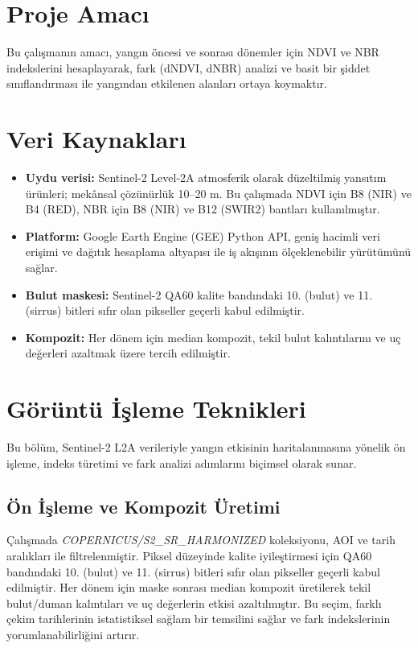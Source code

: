 \documentclass[11pt,a4paper]{article}
\begin{document}
\section{Proje Amacı}
Bu çalışmanın amacı, yangın öncesi ve sonrası dönemler için NDVI ve NBR indekslerini
hesaplayarak, fark (dNDVI, dNBR) analizi ve basit bir şiddet sınıflandırması ile
yangından etkilenen alanları ortaya koymaktır.

\section{Veri Kaynakları}

\begin{itemize}
  \item \textbf{Uydu verisi:} Sentinel-2 Level-2A atmosferik olarak düzeltilmiş yansıtım ürünleri; mekânsal çözünürlük 10--20 m. Bu çalışmada NDVI için B8 (NIR) ve B4 (RED), NBR için B8 (NIR) ve B12 (SWIR2) bantları kullanılmıştır.
  \item \textbf{Platform:} Google Earth Engine (GEE) Python API, geniş hacimli veri erişimi ve dağıtık hesaplama altyapısı ile iş akışının ölçeklenebilir yürütümünü sağlar.
  \item \textbf{Bulut maskesi:} Sentinel-2 QA60 kalite bandındaki 10. (bulut) ve 11. (sirrus) bitleri sıfır olan pikseller geçerli kabul edilmiştir.
  \item \textbf{Kompozit:} Her dönem için median kompozit, tekil bulut kalıntılarını ve uç değerleri azaltmak üzere tercih edilmiştir.
\end{itemize}


\section{Görüntü İşleme Teknikleri}
Bu bölüm, Sentinel-2 L2A verileriyle yangın etkisinin haritalanmasına yönelik ön işleme, indeks türetimi ve fark analizi adımlarını biçimsel olarak sunar.

\subsection{Ön İşleme ve Kompozit Üretimi}
Çalışmada \emph{COPERNICUS/S2\_SR\_HARMONIZED} koleksiyonu, AOI ve tarih aralıkları ile filtrelenmiştir. Piksel düzeyinde kalite iyileştirmesi için QA60 bandındaki 10. (bulut) ve 11. (sirrus) bitleri sıfır olan pikseller geçerli kabul edilmiştir. Her dönem için maske sonrası median kompozit üretilerek tekil bulut/duman kalıntıları ve uç değerlerin etkisi azaltılmıştır. Bu seçim, farklı çekim tarihlerinin istatistiksel sağlam bir temsilini sağlar ve fark indekslerinin yorumlanabilirliğini artırır.
\end{document}
